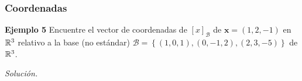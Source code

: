 \begin{frame}\frametitle{Coordenadas}
	
%		
	
	\vspace{0mm}
	
	\begin{ej}{\textbf{Ejemplo 5}}\justifying 
		Encuentre el vector de coordenadas de $\left[ x \right]_{\mathcal{B}}$ de $\mathbf{x}=(1,2,-1)$ 
		en $\mathbb{R}^3$ relativo a la base (no estándar) $\mathcal{B} = \left\{ (1,0,1), (0,-1,2), (2,3,-5) \right\}$ de $\mathbb{R}^3$.
	\end{ej}
	\textit{Solución.}
	
\end{frame}


\subsection{}

